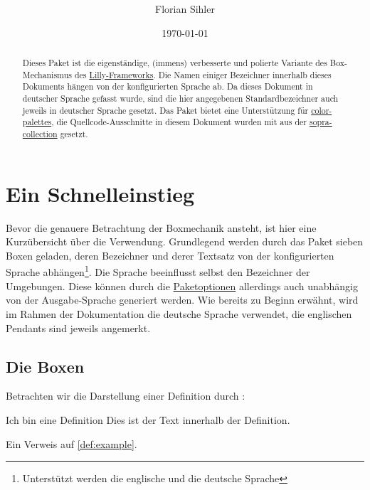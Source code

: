 \documentclass{article}
\title{\textsf{\paletteD{\{}\paletteA{lithie-boxes}\paletteD{\}}}}
\author{Florian Sihler}
\date{\today}
\def\env#1{\texttt{\paletteB{#1}}}
\def\envref#1{\hyperref[env:#1]{\env{#1}}}
\begin{document}
\maketitle

\begin{abstract}
    Dieses Paket ist die eigenständige, (immens) verbesserte und polierte Variante des Box-Mechanismus des \href{https://github.com/EagleoutIce/LILLY}{Lilly-Frameworks}. Die Namen einiger Bezeichner innerhalb dieses Dokuments hängen von der konfigurierten Sprache ab. Da dieses Dokument in deutscher Sprache gefasst wurde, sind die hier angegebenen Standardbezeichner auch jeweils in deutscher Sprache gesetzt. Das Paket bietet eine Unterstützung für \href{https://github.com/EagleoutIce/color-palettes}{color-palettes}, die Quellcode-Ausschnitte in diesem Dokument wurden mit  aus der \href{https://github.com/EagleoutIce/sopra-collection}{sopra-collection} gesetzt.
\end{abstract}

\tableofcontents

\section{Ein Schnelleinstieg}

Bevor die genauere Betrachtung der Boxmechanik ansteht, ist hier eine Kurzübersicht über die Verwendung. Grundlegend werden durch das Paket sieben Boxen geladen, deren Bezeichner und derer Textsatz von der konfigurierten Sprache abhängen\footnote{Unterstützt werden die englische und die deutsche Sprache}.
Die Sprache beeinflusst selbst den Bezeichner der Umgebungen. Diese können durch die \hyperref[sec:packetoptions]{Paketoptionen} allerdings auch unabhängig von der Ausgabe-Sprache generiert werden.
Wie bereits zu Beginn erwähnt, wird im Rahmen der Dokumentation die deutsche Sprache verwendet, die englischen Pendants
sind jeweils angemerkt.

\subsection{Die Boxen}

Betrachten wir die Darstellung einer Definition durch \envref{definition}:

\begin{latex}
\begin{definition}[Referenztitel]{Ich bin eine Definition}
    \label{def:example}Dies ist der Text innerhalb der Definition.
\end{definition}

Ein Verweis auf \autoref{def:example}.
\end{latex}
\end{document}
